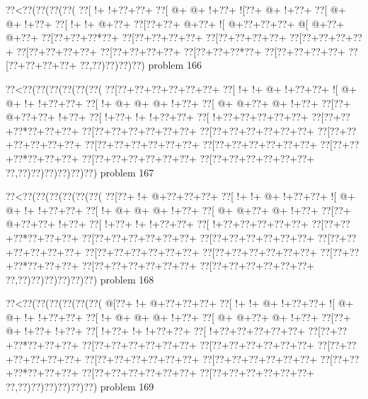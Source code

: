\vbox{\vbox{\goo
\0??<\0??(\0??(\0??(\0??(
\0??[\- !+\- !+\0??+\0??+
\0??[\- @+\- @+\- !+\0??+
\- ![\0??+\- @+\- !+\0??+
\0??[\- @+\- @+\- !+\0??+
\0??[\- !+\- !+\- @+\0??+
\0??[\0??+\0??+\- @+\0??+
\- ![\- @+\0??+\0??+\0??+
\- @[\- @+\0??+\- @+\0??+
\0??[\0??+\0??+\0??*\0??+
\0??[\0??+\0??+\0??+\0??+
\0??[\0??+\0??+\0??+\0??+
\0??[\0??+\0??+\0??+\0??+
\0??[\0??+\0??+\0??+\0??+
\0??[\0??+\0??+\0??+\0??+
\0??[\0??+\0??+\0??*\0??+
\0??[\0??+\0??+\0??+\0??+
\0??[\0??+\0??+\0??+\0??+
\0??,\0??)\0??)\0??)\0??)
}
\hfil problem 166\hfil\break
}

\vbox{\vbox{\goo
\0??<\0??(\0??(\0??(\0??(\0??(\0??(
\0??[\0??+\0??+\0??+\0??+\0??+\0??+
\0??[\- !+\- !+\- @+\- !+\0??+\0??+
\- ![\- @+\- @+\- !+\- !+\0??+\0??+
\0??[\- !+\- @+\- @+\- @+\- !+\0??+
\0??[\- @+\- @+\0??+\- @+\- !+\0??+
\0??[\0??+\- @+\0??+\0??+\- !+\0??+
\0??[\- !+\0??+\- !+\- !+\0??+\0??+
\0??[\- !+\0??+\0??+\0??+\0??+\0??+
\0??[\0??+\0??+\0??*\0??+\0??+\0??+
\0??[\0??+\0??+\0??+\0??+\0??+\0??+
\0??[\0??+\0??+\0??+\0??+\0??+\0??+
\0??[\0??+\0??+\0??+\0??+\0??+\0??+
\0??[\0??+\0??+\0??+\0??+\0??+\0??+
\0??[\0??+\0??+\0??+\0??+\0??+\0??+
\0??[\0??+\0??+\0??*\0??+\0??+\0??+
\0??[\0??+\0??+\0??+\0??+\0??+\0??+
\0??[\0??+\0??+\0??+\0??+\0??+\0??+
\0??,\0??)\0??)\0??)\0??)\0??)\0??)
}
\hfil problem 167\hfil\break
}

\vbox{\vbox{\goo
\0??<\0??(\0??(\0??(\0??(\0??(\0??(
\0??[\0??+\- !+\- @+\0??+\0??+\0??+
\0??[\- !+\- !+\- @+\- !+\0??+\0??+
\- ![\- @+\- @+\- !+\- !+\0??+\0??+
\0??[\- !+\- @+\- @+\- @+\- !+\0??+
\0??[\- @+\- @+\0??+\- @+\- !+\0??+
\0??[\0??+\- @+\0??+\0??+\- !+\0??+
\0??[\- !+\0??+\- !+\- !+\0??+\0??+
\0??[\- !+\0??+\0??+\0??+\0??+\0??+
\0??[\0??+\0??+\0??*\0??+\0??+\0??+
\0??[\0??+\0??+\0??+\0??+\0??+\0??+
\0??[\0??+\0??+\0??+\0??+\0??+\0??+
\0??[\0??+\0??+\0??+\0??+\0??+\0??+
\0??[\0??+\0??+\0??+\0??+\0??+\0??+
\0??[\0??+\0??+\0??+\0??+\0??+\0??+
\0??[\0??+\0??+\0??*\0??+\0??+\0??+
\0??[\0??+\0??+\0??+\0??+\0??+\0??+
\0??[\0??+\0??+\0??+\0??+\0??+\0??+
\0??,\0??)\0??)\0??)\0??)\0??)\0??)
}
\hfil problem 168\hfil\break
}

\vbox{\vbox{\goo
\0??<\0??(\0??(\0??(\0??(\0??(\0??(
\- @[\0??+\- !+\- @+\0??+\0??+\0??+
\0??[\- !+\- !+\- @+\- !+\0??+\0??+
\- ![\- @+\- @+\- !+\- !+\0??+\0??+
\0??[\- !+\- @+\- @+\- @+\- !+\0??+
\0??[\- @+\- @+\0??+\- @+\- !+\0??+
\0??[\0??+\- @+\- !+\0??+\- !+\0??+
\0??[\- !+\0??+\- !+\- !+\0??+\0??+
\0??[\- !+\0??+\0??+\0??+\0??+\0??+
\0??[\0??+\0??+\0??*\0??+\0??+\0??+
\0??[\0??+\0??+\0??+\0??+\0??+\0??+
\0??[\0??+\0??+\0??+\0??+\0??+\0??+
\0??[\0??+\0??+\0??+\0??+\0??+\0??+
\0??[\0??+\0??+\0??+\0??+\0??+\0??+
\0??[\0??+\0??+\0??+\0??+\0??+\0??+
\0??[\0??+\0??+\0??*\0??+\0??+\0??+
\0??[\0??+\0??+\0??+\0??+\0??+\0??+
\0??[\0??+\0??+\0??+\0??+\0??+\0??+
\0??,\0??)\0??)\0??)\0??)\0??)\0??)
}
\hfil problem 169\hfil\break
}

